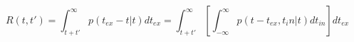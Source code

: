 \begin{equation}
R(t,t') = \int_{t+t'}^\infty p(t_{ex}-t|t) dt_{ex}  = \int_{t+t'}^\infty \left[ \int_{-\infty}^\infty p(t-t_{ex},t_in|t) dt_{in} \right]  dt_{ex}
\end{equation}